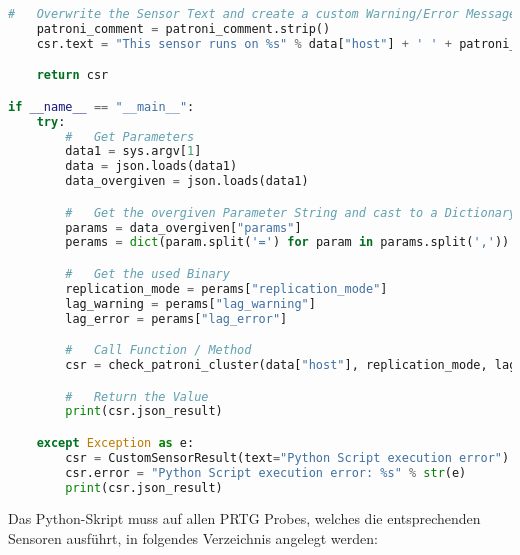 \begin{flushleft}
\begin{lstlisting}[language=python, caption=Monitoring - KSGR - Patroni - Healthcheck.py,captionpos=b,label={lst:monitoring-python},breaklines=true]
    #   Overwrite the Sensor Text and create a custom Warning/Error Message
    patroni_comment = patroni_comment.strip()
    csr.text = "This sensor runs on %s" % data["host"] + ' ' + patroni_comment

    return csr

if __name__ == "__main__":
    try:
        #   Get Parameters
        data1 = sys.argv[1]
        data = json.loads(data1)
        data_overgiven = json.loads(data1)

        #   Get the overgiven Parameter String and cast to a Dictionary
        params = data_overgiven["params"]
        perams = dict(param.split('=') for param in params.split(','))

        #   Get the used Binary
        replication_mode = perams["replication_mode"]
        lag_warning = perams["lag_warning"]
        lag_error = perams["lag_error"]

        #   Call Function / Method
        csr = check_patroni_cluster(data["host"], replication_mode, lag_warning, lag_error)

        #   Return the Value
        print(csr.json_result)

    except Exception as e:
        csr = CustomSensorResult(text="Python Script execution error")
        csr.error = "Python Script execution error: %s" % str(e)
        print(csr.json_result)
    \end{lstlisting}
\end{flushleft}
\begin{flushleft}
    Das Python-Skript muss auf allen \Gls{PRTG} Probes, welches die entsprechenden Sensoren ausführt, in folgendes Verzeichnis angelegt werden:\\
\end{flushleft}
